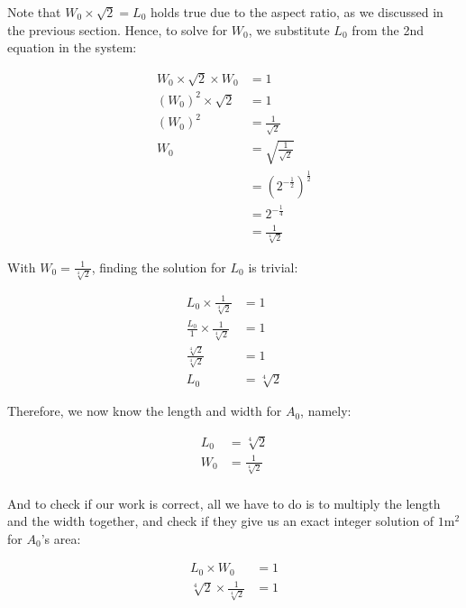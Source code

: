 \noindent
Note that $W_0 \times \sqrt{2} = L_0$ holds true due to the aspect ratio, as we discussed in the previous section. Hence, to solve for $W_0$, we substitute $L_0$ from the 2nd equation in the system:

\begin{align*}
  W_0 \times \sqrt{2} \times W_0 &= 1 \\
  \left(W_0\right)^2 \times \sqrt{2} &=1 \\
  \left(W_0\right)^2 &= \frac{1}{\sqrt{2}} \\
  W_0 &= \sqrt{\frac{1}{\sqrt{2}}} \\
  &= \left(2^{-\frac{1}{2}}\right)^{\frac{1}{2}} \\
  &= 2^{-\frac{1}{4}} \\
  &= \frac{1}{\sqrt[4]{2}}
\end{align*}

\noindent
With $W_0 = \frac{1}{\sqrt[4]{2}}$, finding the solution for $L_0$ is trivial:

\begin{align*}
  L_0 \times \frac{1}{\sqrt[4]{2}} &= 1 \\
  \frac{L_0}{1} \times \frac{1}{\sqrt[4]{2}} &= 1 \\
  \frac{\sqrt[4]{2}}{\sqrt[4]{2}} &= 1 \\
  L_0 &= \sqrt[4]{2}
\end{align*}

\noindent
Therefore, we now know the length and width for $A_0$, namely:

\begin{align*}
  L_0 &= \sqrt[4]{2} \\
  W_0 &= \frac{1}{\sqrt[4]{2}} \\
\end{align*}

\noindent
And to check if our work is correct, all we have to do is to multiply the length and the width together, and check if they give us an exact integer solution of $1\si{\meter\squared}$ for $A_0$'s area:

\begin{align*}
  L_0 \times W_0 &= 1 \\
  \sqrt[4]{2} \times \frac{1}{\sqrt[4]{2}} &= 1
\end{align*}

